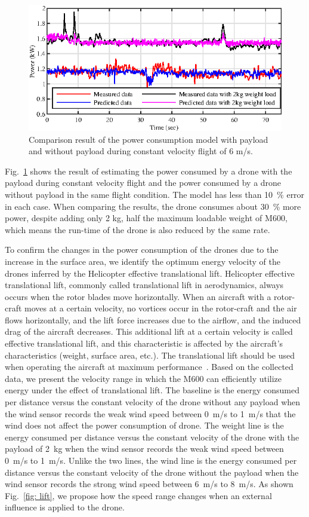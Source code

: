 \documentclass[journal]{./template/IEEEtran}
\begin{document}
\begin{figure}[ht]
\centering\includegraphics[scale=1.1]{fig9/compare_weight8x4.eps}
\caption{Comparison result of the power consumption model with payload and without payload during constant velocity flight of 6 m/s.}
\label{fig: Model_weight}
\end{figure}

Fig.~\ref{fig: Model_weight} shows the result of estimating the power consumed by a drone with the payload during constant velocity flight and the power consumed by a drone without payload in the same flight condition. The model has less than 10~\% error in each case. 
When comparing the results, the drone consumes about 30~\% more power, despite adding only 2 kg, half the maximum loadable weight of M600, which means the run-time of the drone is also reduced by the same rate.

To confirm the changes in the power consumption of the drones due to the increase in the surface area, we identify the optimum energy velocity of the drones inferred by the Helicopter effective translational lift.
Helicopter effective translational lift, commonly called translational lift in aerodynamics, always occurs when the rotor blades move horizontally. When an aircraft with a rotor-craft moves at a certain velocity, no vortices occur in the rotor-craft and the air flows horizontally, and the lift force increases due to the airflow, and the induced drag of the aircraft decreases. 
This additional lift at a certain velocity is called effective translational lift, and this characteristic is affected by the aircraft's characteristics (weight, surface area, etc.). 
The translational lift should be used when operating the aircraft at maximum performance~\cite{ref_20}.
Based on the collected data, we present the velocity range in which the M600 can efficiently utilize energy under the effect of translational lift. 
The baseline is the energy consumed per distance versus the constant velocity of the drone without any payload when the wind sensor records the weak wind speed between 0~m/s to 1~m/s that the wind does not affect the power consumption of drone.
The weight line is the energy consumed per distance versus the constant velocity of the drone with the payload of 2~kg when the wind sensor records the weak wind speed between 0~m/s to 1~m/s.
Unlike the two lines, the wind line is the energy consumed per distance versus the constant velocity of the drone without the payload when the wind sensor records the strong wind speed between 6~m/s to 8~m/s. 
As shown Fig.~\ref{fig: lift}, we propose how the speed range changes when an external influence is applied to the drone.
\end{document}
